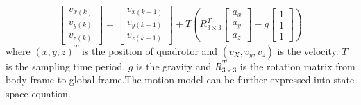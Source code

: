 \documentclass{cisXXX} %
\begin{document}
\begin{equation}
\begin{bmatrix}
v_{x(k)} \\
v_{y(k)} \\
v_{z(k)} 
\end{bmatrix}=\begin{bmatrix}
v_{x(k-1)} \\
v_{y(k-1)} \\
v_{z(k-1)} 
\end{bmatrix}+T\left(R^T_{3\times3}\begin{bmatrix}
a_x   \\
a_y   \\
a_z
\end{bmatrix}-g\begin{bmatrix}
1  \\
1  \\
1
\end{bmatrix}\right)
\end{equation}
where $(x,y,z)^T$ is the position of quadrotor and $(v_X,v_y,v_z)$ is the velocity. $T$ is the sampling time period, $g$ is the gravity and $R^T_{3\times3}$ is the rotation matrix from body frame to global frame.The motion model can be further expressed into state space equation.
\end{document}
